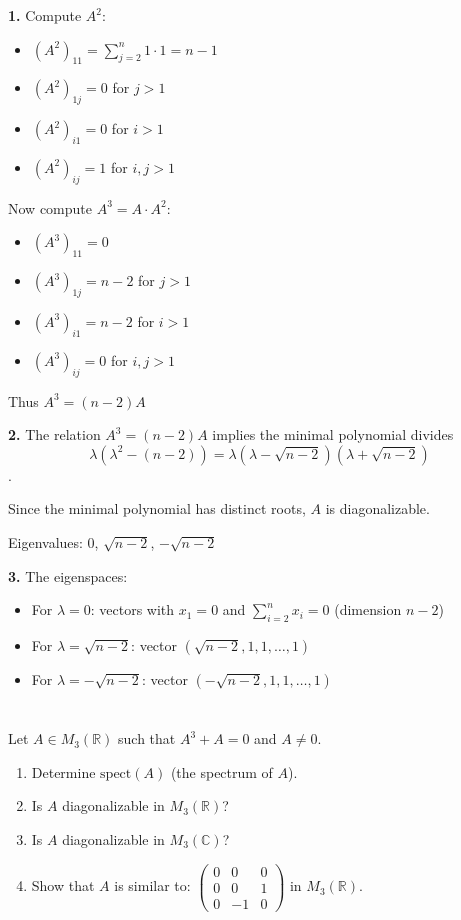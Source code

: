 \documentclass[12pt]{article}
\begin{document}
\begin{correctionbox}
\textbf{1.} Compute $A^2$:
\begin{itemize}
    \item  $(A^2)_{11} = \sum_{j=2}^n 1\cdot 1 = n-1$
    \item $(A^2)_{1j} = 0$ for $j > 1$
    \item $(A^2)_{i1} = 0$ for $i > 1$  
    \item $(A^2)_{ij} = 1$ for $i,j > 1$
\end{itemize}

Now compute $A^3 = A \cdot A^2$:
\begin{itemize}
    \item  $(A^3)_{11} = 0$
    \item $(A^3)_{1j} = n-2$ for $j > 1$
    \item $(A^3)_{i1} = n-2$ for $i > 1$
    \item $(A^3)_{ij} = 0$ for $i,j > 1$
\end{itemize}

Thus $A^3 = (n-2)A$

\textbf{2.} The relation $A^3 = (n-2)A$ implies the minimal polynomial divides $$\lambda(\lambda^2 - (n-2)) = \lambda(\lambda - \sqrt{n-2})(\lambda + \sqrt{n-2})$$.

Since the minimal polynomial has distinct roots, $A$ is diagonalizable.

Eigenvalues: $0$, $\sqrt{n-2}$, $-\sqrt{n-2}$

\textbf{3.} The eigenspaces:
\begin{itemize}
    \item For $\lambda = 0$: vectors with $x_1 = 0$ and $\sum_{i=2}^n x_i = 0$ (dimension $n-2$)
    \item For $\lambda = \sqrt{n-2}$: vector $( \sqrt{n-2}, 1, 1, \ldots, 1 )$
    \item For $\lambda = -\sqrt{n-2}$: vector $( -\sqrt{n-2}, 1, 1, \ldots, 1 )$
\end{itemize}
\end{correctionbox}

\section{}
Let $A \in M_{3}(\mathbb{R})$ such that $A^{3}+A=0$ and $A\ne0$.
\begin{enumerate}
    \item Determine $\text{spect}(A)$ (the spectrum of $A$).
    \item Is $A$ diagonalizable in $M_{3}(\mathbb{R})$?
    \item Is $A$ diagonalizable in $M_{3}(\mathbb{C})$?
    \item Show that $A$ is similar to: $\begin{pmatrix}0&0&0\\ 0&0&1\\ 0&-1&0\end{pmatrix}$ in $M_{3}(\mathbb{R})$.
\end{enumerate}
\end{document}
